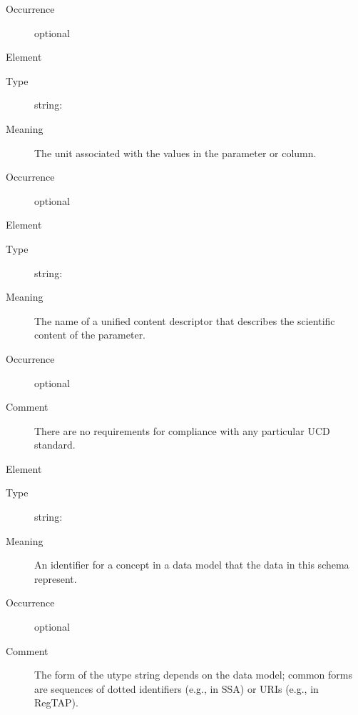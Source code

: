 \documentclass[11pt,a4paper]{ivoa}
\begin{document}
\begin{generated}
\begin{bigdescription}
\begin{description}
\item[Occurrence] optional

\end{description}
\item[Element \xmlel{unit}]
\begin{description}
\item[Type] string: 
\item[Meaning]
                  The unit associated with the values in the parameter
                  or column.

\item[Occurrence] optional

\end{description}
\item[Element \xmlel{ucd}]
\begin{description}
\item[Type] string: 
\item[Meaning]
                  The name of a unified content descriptor that
                  describes the scientific content of the parameter.

\item[Occurrence] optional
\item[Comment]
                  There are no requirements for compliance with any
                  particular UCD standard.


\end{description}
\item[Element \xmlel{utype}]
\begin{description}
\item[Type] string: 
\item[Meaning]
                  An identifier for a concept in a data model that
                  the data in this schema represent.

\item[Occurrence] optional
\item[Comment]
                  The form of the utype string depends on the data
                  model; common forms are sequences of dotted identifiers
                  (e.g., in SSA) or URIs (e.g., in RegTAP).


\end{description}


\end{bigdescription}\endgroup

\endgroup
\end{generated}
\end{document}
